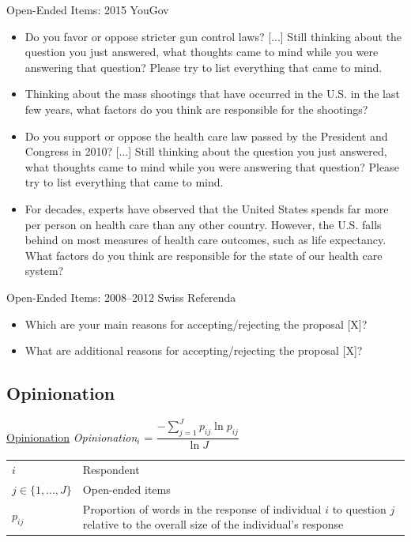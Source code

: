 \begin{frame}{Open-Ended Items: 2015 YouGov}
\begin{itemize}
\item Do you favor or oppose stricter gun control laws? [...] Still thinking about the question you just answered, what thoughts came to mind while you were answering that question? Please try to list everything that came to mind.
\item Thinking about the mass shootings that have occurred in the U.S. in the last few years, what factors do you think are responsible for the shootings?
\item Do you support or oppose the health care law passed by the President and Congress in 2010?
[...] Still thinking about the question you just answered, what thoughts came to mind while you were answering that question? Please try to list everything that came to mind.
\item For decades, experts have observed that the United States spends far more per person on health care than any other country. However, the U.S. falls behind on most measures of health care outcomes, such as life expectancy. What factors do you think are responsible for the state of our health care system?
\end{itemize}
\end{frame}

\begin{frame}{Open-Ended Items: 2008--2012 Swiss Referenda}
\begin{itemize}
\item Which are your main reasons for accepting/rejecting the proposal [X]?
\item What are additional reasons for accepting/rejecting the proposal [X]?
\end{itemize}
\end{frame}

\subsection{Opinionation}
\begin{frame}{\hyperlink{components}{Opinionation}}\label{opinionation}\centering
\emph{Opinionation$_i$} = $\dfrac{-\sum_{j=1}^J p_{ij} \ln p_{ij}}{\ln J}$
\vspace{1em}\\
\begin{tabular}{lp{9cm}}
	\toprule
	$i$ & Respondent \\
	$j \in \{1,...,J\}$ & Open-ended items \\
	$p_{ij}$ & Proportion of words in the response of individual $i$ to question $j$ relative to the overall size of the individual's response\\
\end{tabular}
\end{frame}

